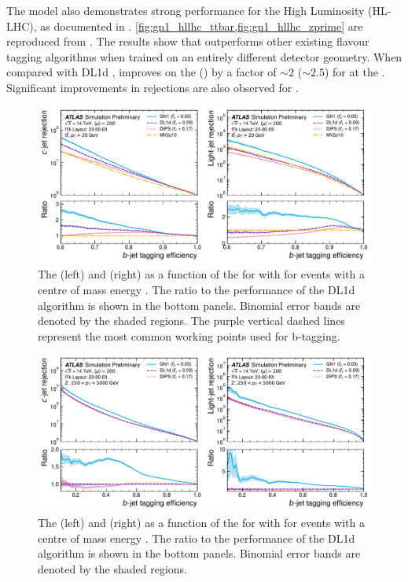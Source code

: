The model also demonstrates strong performance for the High Luminosity \LHC (HL-LHC), as documented in .
\cref{fig:gn1_hllhc_ttbar,fig:gn1_hllhc_zprime} are reproduced from .
The results show that \GNN outperforms other existing flavour tagging algorithms when trained on an entirely different detector geometry.
When compared with DL1d \cite{ATLAS:2022qxm}, \GNN improves on the \crej (\lrej) by a factor of $\sim 2$ ($\sim 2.5$) for \ttbarjets at the .
Significant improvements in rejections are also observed for \Zprimejets.

\begin{figure}[!p]
    \centering
    \includegraphics[width=\textwidth]{chapters/gnn_tagger/figs/gn1_hl_ttbar.pdf}
    \caption{
        The \crej (left) and \lrej (right) as a function of the \beff for \ttbarjets with \ttbarpt for events with a centre of mass energy  \cite{ATL-PHYS-PUB-2022-047}.
        The ratio to the performance of the DL1d algorithm is shown in the bottom panels.
        Binomial error bands are denoted by the shaded regions.
        The purple vertical dashed lines represent the most common working points used for b-tagging.
    }
    \label{fig:gn1_hllhc_ttbar}
\end{figure}

\begin{figure}[!p]
    \centering
    \includegraphics[width=\textwidth]{chapters/gnn_tagger/figs/gn1_hl_zprime.pdf}
    \caption{
        The \crej (left) and \lrej (right) as a function of the \beff for \Zprimejets with \Zprimept for events with a centre of mass energy  \cite{ATL-PHYS-PUB-2022-047}.
        The ratio to the performance of the DL1d algorithm is shown in the bottom panels.
        Binomial error bands are denoted by the shaded regions.
    }
    \label{fig:gn1_hllhc_zprime}
\end{figure}




